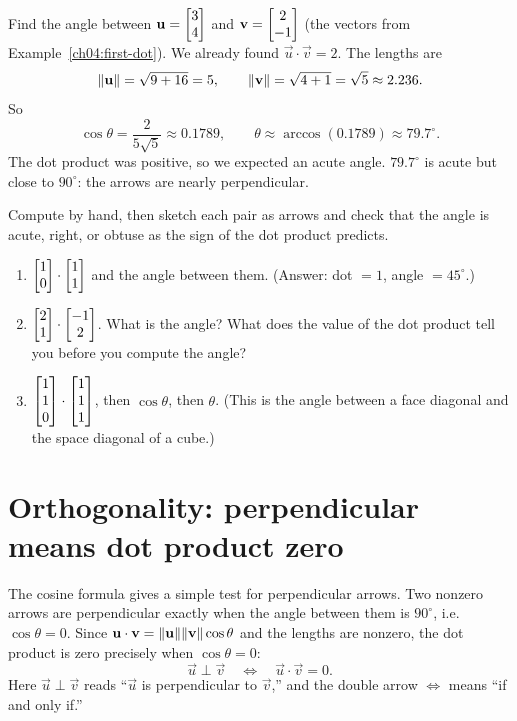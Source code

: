 \begin{example}\label{ch04:angle-ex}
Find the angle between $\mathbf{u} = \begin{bmatrix}3\\4\end{bmatrix}$ and $\mathbf{v} = \begin{bmatrix}2\\-1\end{bmatrix}$
(the vectors from Example~\ref{ch04:first-dot}). We already found
$\vec u\cdot\vec v = 2$. The lengths are
\[
  \lVert\mathbf{u}\rVert = \sqrt{9+16} = 5, \qquad
  \lVert\mathbf{v}\rVert = \sqrt{4+1} = \sqrt5 \approx 2.236.
\]
So
\[
  \cos\theta = \frac{2}{5\sqrt5} \approx 0.1789,
  \qquad
  \theta \approx \arccos(0.1789) \approx 79.7^\circ.
\]
The dot product was positive, so we expected an acute angle. $79.7^\circ$ is acute
but close to $90^\circ$: the arrows are nearly perpendicular.
\end{example}

\begin{labbox}
Compute by hand, then sketch each pair as arrows and check that the angle is acute,
right, or obtuse as the sign of the dot product predicts.
\begin{enumerate}
  \item $\begin{bmatrix}1\\0\end{bmatrix}\cdot\begin{bmatrix}1\\1\end{bmatrix}$ and the angle between them.
        (Answer: dot $=1$, angle $=45^\circ$.)
  \item $\begin{bmatrix}2\\1\end{bmatrix}\cdot\begin{bmatrix}-1\\2\end{bmatrix}$. What is the angle? What does the
        value of the dot product tell you before you compute the angle?
  \item $\begin{bmatrix}1\\1\\0\end{bmatrix}\cdot\begin{bmatrix}1\\1\\1\end{bmatrix}$, then $\cos\theta$, then $\theta$.
        (This is the angle between a face diagonal and the space diagonal of a
        cube.)
\end{enumerate}
\end{labbox}

\section{Orthogonality: perpendicular means dot product zero}
\label{ch04:orth-sec}

The cosine formula gives a simple test for perpendicular arrows. Two nonzero
arrows are perpendicular exactly when the angle between them is $90^\circ$, i.e.
$\cos\theta = 0$. Since $\mathbf{u}\cdot\mathbf{v} = \lVert\mathbf{u}\rVert\lVert\mathbf{v}\rVert\cos\theta$
and the lengths are nonzero, the dot product is zero precisely when $\cos\theta = 0$:
\[
  \vec u \perp \vec v \quad\Longleftrightarrow\quad \vec u\cdot\vec v = 0.
\]
Here $\vec u\perp\vec v$ reads ``$\vec u$ is perpendicular to $\vec v$,'' and the
double arrow $\Longleftrightarrow$ means ``if and only if.''

